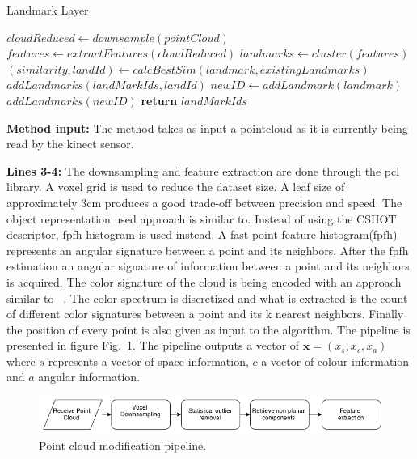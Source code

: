 \documentclass[twoside,hidelinks]{article}
\begin{document}
\begin{algorithm}
  \caption{Landmark Layer}\label{euclid}
  \begin{algorithmic}[1]
      \State $cloudReduced \gets downsample(pointCloud)$ 
      \State $features \gets extractFeatures(cloudReduced)$
      \State $landmarks \gets cluster(features)$  
	      \State $ (similarity, landId) \gets calcBestSim(landmark, existingLandmarks) $
			   \State $ addLandmarks(landMarkIds, landId)$
			\Else 
               \State $ newID \gets addLandmark(landmark)$
			   \State $addLandmarks(newID)$
			\EndIf
      \EndFor
      \State \textbf{return} $ landMarkIds$
    \EndProcedure
  \end{algorithmic}
\end{algorithm}


\textbf{Method input:} The method takes as input a pointcloud as it is currently being read by the kinect sensor.

\textbf{Lines 3-4:} The downsampling and feature extraction are done through the pcl\cite{pcl} library. A voxel grid is used to reduce the dataset size. A leaf size of approximately 3cm produces a good trade-off between precision and speed. The object representation used approach is similar to\cite{objectpointSLAM}. Instead of using the CSHOT descriptor, fpfh\cite{fpfh} histogram is used instead. A fast point feature histogram(fpfh) represents an angular signature between a point and its neighbors. After the fpfh estimation an angular signature of information between a point and its neighbors is acquired. The color signature of the cloud is being encoded with an approach similar to ~\cite{smcddp}. The color spectrum is discretized and what is extracted is the count of different color signatures between a point and its k nearest neighbors. Finally the position of every point is also given as input to the algorithm. The pipeline is presented in figure Fig.~\ref{pcl:mod}. The pipeline outputs a vector of $ \textbf{x} = (x_s, x_c, x_a) $  where $s$ represents a vector of space information, $c$ a vector of colour information and $a$ angular information. 

\begin{figure}[ht!]
  \centering
    \includegraphics[width=1\textwidth]{Basic}
  \caption{Point cloud modification pipeline.}
  \label{pcl:mod}
\end{figure}
\end{document}
